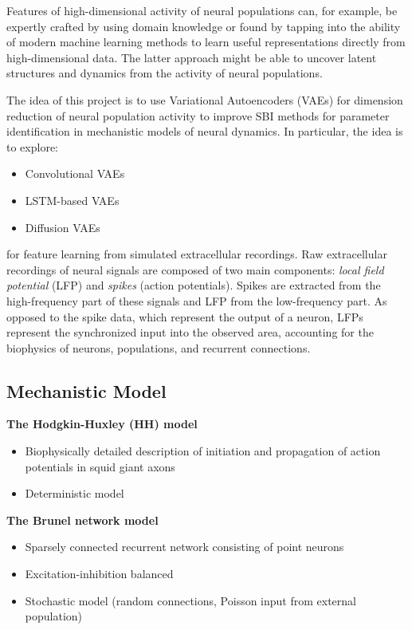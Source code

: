 Features of high-dimensional activity of neural populations can, for example, be expertly crafted by using domain knowledge or found by tapping into the ability of modern machine learning methods to learn useful representations directly from high-dimensional data. The latter approach might be able to uncover latent structures and dynamics from the activity of neural populations.

The idea of this project is to use Variational Autoencoders (VAEs) for dimension reduction of neural population activity to improve SBI methods for parameter identification in mechanistic models of neural dynamics. In particular, the idea is to explore:

\begin{itemize}
    \item Convolutional VAEs
    \item LSTM-based VAEs
    \item Diffusion VAEs
\end{itemize}


for feature learning from simulated extracellular recordings. Raw extracellular recordings of neural signals are composed of two main components: \textit{local field potential} (LFP) and \textit{spikes} (action potentials). Spikes are extracted from the high-frequency part of these signals and LFP from the low-frequency part. As opposed to the spike data, which represent the output of a neuron, LFPs represent the synchronized input into the observed area, accounting for the biophysics of neurons, populations, and recurrent connections.

\subsection{Mechanistic Model}

\textbf{The Hodgkin-Huxley (HH) model}

\begin{itemize}
    \item Biophysically detailed description of initiation and propagation of action potentials in squid giant axons
    \item Deterministic model
\end{itemize}

\textbf{The Brunel network model}

\begin{itemize}
    \item Sparsely connected recurrent network consisting of point neurons
    \item Excitation-inhibition balanced
    \item Stochastic model (random connections, Poisson input from external population)
\end{itemize}
    

